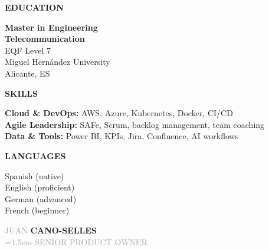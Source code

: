 \documentclass[12pt,a4paper]{article} %
\newcommand{\headleft}[1]{%
  \vspace*{2ex}\textsc{\textbf{\color{softwhite}#1}}\par%
  \vspace*{-1.2ex}{\color{softwhite}\hrulefill}\par\vspace*{0.8ex}
}
\newlength{\SideBarW}
\begin{document}
\begin{minipage}[t]{\textwidth}
{{\begin{minipage}[t]{\dimexpr\linewidth-8mm\relax}
      \headleft{EDUCATION}
      \textbf{Master in Engineering} \\[0.2ex]
      \textbf{Telecommunication} \\[0.8ex]
      {\small EQF Level 7} \\[0.6ex]
      {\small Miguel Hernández University} \\[0.6ex]
      {\small Alicante, ES}

      \vspace*{3mm}

      \headleft{SKILLS}
      \textbf{Cloud \& DevOps:} AWS, Azure, Kubernetes, Docker, CI/CD \\[0.6ex]
      \textbf{Agile Leadership:} SAFe, Scrum, backlog management, team coaching \\[0.6ex]
      \textbf{Data \& Tools:} Power BI, KPIs, Jira, Confluence, AI workflows

      \vspace*{3mm}

      \headleft{LANGUAGES}
      Spanish (native) \\[0.4ex]
      English (proficient) \\[0.4ex]
      German (advanced) \\[0.4ex]
      French (beginner)

    \end{minipage}
  }%
}%
\hspace{4mm}%
\begin{minipage}[t]{\dimexpr\textwidth-\SideBarW-4mm\relax}
  \raggedright
  \setlength{\parskip}{0.6ex}

\vspace*{14mm} %
\begin{center}
  {\sffont\fontsize{40}{42}\textcolor{darkgray}{JUAN}}%
  \hspace{1.2em}%
  {\sffont\fontsize{40}{42}\bfseries{}\textcolor{cvblue}{CANO-SELLES}}\\[2ex]

  {\sffont\fontsize{16}{18}\textcolor{darkgray}{\spaceskip=1.5em SENIOR PRODUCT OWNER}}\\[1ex]
\end{center}

\vspace{4mm}


\end{minipage}
\end{minipage}
\end{document}
